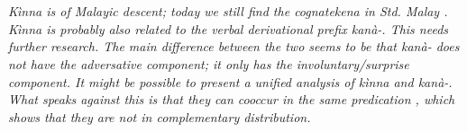  \\ 
 \\
\em Kìnna \em  is of Malayic descent; today we still find the cognate\em kena \em in Std. Malay \citep{Chung2005kena}. \em Kìnna \em is probably also related to the verbal derivational prefix \em kanà-\em. This needs further research. The main difference between the two seems to be that \em kanà- \em does not have the adversative component; it only has the involuntary/surprise component.
It might be possible to present a unified analysis of \em kìnna \em and \em kanà-\em. What speaks against this is that they can cooccur in the same predication , which shows that they are not in complementary distribution.

  






%  
% 
% 

